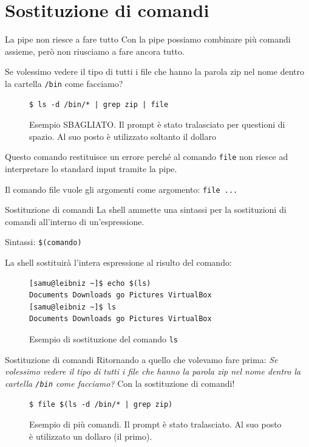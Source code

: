 \documentclass{beamer}
\begin{document}
\section{Sostituzione di comandi}
\begin{frame}[fragile]{La pipe non riesce a fare tutto}
  Con la pipe possiamo combinare più comandi assieme, però non riusciamo a fare
  ancora tutto. \medskip

  Se volessimo vedere il tipo di tutti i file che hanno la parola zip nel nome
  dentro la cartella \texttt{/bin} come facciamo? \medskip \pause

  \begin{figure}
    \begin{lstlisting}
$ ls -d /bin/* | grep zip | file
    \end{lstlisting}
    \caption{Esempio SBAGLIATO. Il prompt è stato tralasciato per questioni di 
    spazio. Al suo posto è utilizzato soltanto il dollaro}
  \end{figure}
  
  Questo comando restituisce un errore perché al comando \texttt{file} non 
  riesce ad interpretare lo standard input tramite la pipe. \pause

  Il comando file vuole gli argomenti come argomento: \texttt{file ...}
\end{frame}

\begin{frame}[fragile]{Sostituzione di comandi}
  La shell ammette una sintassi per la sostituzioni di comandi all'interno di
  un'espressione. \medskip

  Sintassi: \texttt{\$(comando)} \medskip

  La shell sostituirà l'intera espressione al risulto del comando:
  \begin{figure}
    \begin{lstlisting}
[samu@leibniz ~]$ echo $(ls)
Documents Downloads go Pictures VirtualBox
[samu@leibniz ~]$ ls
Documents Downloads go Pictures VirtualBox
    \end{lstlisting}
    \caption{Esempio di sostituzione del comando \texttt{ls}}
  \end{figure}
\end{frame}

\begin{frame}[fragile]{Sostituzione di comandi}
  Ritornando a quello che volevamo fare prima: \textit{Se volessimo vedere il 
  tipo di tutti i file che hanno la parola zip nel nome dentro la cartella 
  \texttt{/bin} come facciamo?} \pause Con la sostituzione di comandi! \medskip

  \begin{figure}
    \begin{lstlisting}
$ file $(ls -d /bin/* | grep zip)
    \end{lstlisting}
    \caption{Esempio di più comandi. Il prompt è stato tralasciato. Al suo posto
    è utilizzato un dollaro (il primo).}
  \end{figure}
\end{frame}
\end{document}
